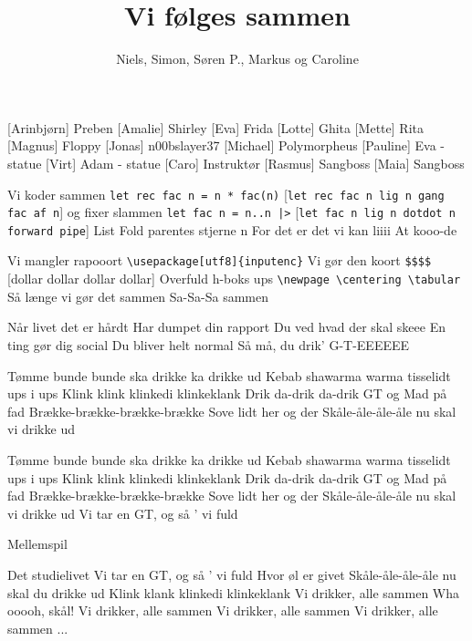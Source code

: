 \documentclass[a4paper,11pt]{article}
\title{Vi følges sammen}
\author{Niels, Simon, Søren P., Markus og Caroline}
\begin{document}
\maketitle

\begin{roles}
  [Arinbjørn] Preben 
  [Amalie] Shirley
  [Eva] Frida
  [Lotte] Ghita
  [Mette] Rita 
  [Magnus] Floppy
  [Jonas] n00bslayer37
  [Michael] Polymorpheus
  [Pauline] Eva - statue
  [Virt] Adam - statue
  [Caro] Instruktør
  [Rasmus] Sangboss
  [Maia] Sangboss
\end{roles}

\begin{song}
  Vi koder sammen
  \verb!let rec fac n = n * fac(n)!
  [\verb!let rec fac n lig n gang fac af n!]
  og fixer slammen
  \verb!let fac n = n..n |>!
  [\verb!let fac n lig n dotdot n forward pipe!]
  List Fold parentes stjerne n
  For det er det vi kan liiii
  At kooo-de

  Vi mangler rapooort
  \verb!\usepackage[utf8]{inputenc}!
  Vi gør den koort
  \verb!$$$$!
  [dollar dollar dollar dollar]
  Overfuld h-boks ups
  \verb!\newpage \centering \tabular!
  Så længe vi gør det sammen
  Sa-Sa-Sa sammen

  Når livet det er hårdt
  Har dumpet din rapport
  Du ved hvad der skal skeee
  En ting gør dig social
  Du bliver helt normal
  Så må, du drik' G-T-EEEEEE

  Tømme bunde bunde ska drikke ka drikke ud
  Kebab shawarma warma tisselidt ups i ups
  Klink klink klinkedi klinkeklank
  Drik da-drik da-drik GT og Mad på fad
  Brække-brække-brække-brække
  Sove lidt her og der
  Skåle-åle-åle-åle nu skal vi drikke ud

  Tømme bunde bunde ska drikke ka drikke ud
  Kebab shawarma warma tisselidt ups i ups
  Klink klink klinkedi klinkeklank
  Drik da-drik da-drik GT og Mad på fad
  Brække-brække-brække-brække
  Sove lidt her og der
  Skåle-åle-åle-åle nu skal vi drikke ud
  Vi tar en GT, og så ' vi fuld

  Mellemspil

  Det studielivet
  Vi tar en GT, og så ' vi fuld
  Hvor øl er givet
  Skåle-åle-åle-åle nu skal du drikke ud
  Klink klank klinkedi klinkeklank
  Vi drikker, alle sammen
  Wha ooooh, skål!
  Vi drikker, alle sammen
  Vi drikker, alle sammen
  Vi drikker, alle sammen
  ...
\end{song}
\end{document}
